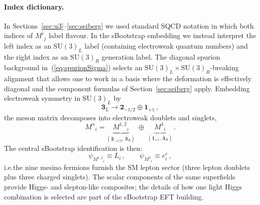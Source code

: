 \documentclass[11pt,a4paper]{article}
\makeatletter
\newcommand{\SU}{\mathrm{SU}}
\newcommand{\ie}{i.e.\@}
\makeatother
\begin{document}
\paragraph{Index dictionary.}
In Sections~\ref{sec:u3}--\ref{sec:seiberg} we used standard SQCD notation in
which both indices of $M^i{}_j$ label flavour.  In the sBootstrap embedding we
instead interpret the left index as an $\SU(3)_L$ label (containing electroweak
quantum numbers) and the right index as an $\SU(3)_R$ generation label.
The diagonal spurion background in~(\ref{eq:spurionSigma}) selects an
$\SU(3)_L\times\SU(3)_R$-breaking alignment that allows one to work in a basis
where the deformation is effectively diagonal and the component formulas of
Section~\ref{sec:seiberg} apply.
Embedding electroweak symmetry in $\SU(3)_L$ by
\begin{equation}
  \mathbf{3}_L \to \mathbf{2}_{-1/2}\oplus \mathbf{1}_{+1}\,,
  \label{eq:3L_decomp}
\end{equation}
the meson matrix decomposes into electroweak doublets and singlets,
\begin{equation}
  M^\alpha{}_i
  = \underbrace{M^{1,2}{}_i}_{(\mathbf{2}_{-1/2},\,\bar{\mathbf{3}}_R)}
  \;\oplus\;
  \underbrace{M^{3}{}_i}_{(\mathbf{1}_{+1},\,\bar{\mathbf{3}}_R)}\,.
  \label{eq:meson_decomp}
\end{equation}
The central sBootstrap identification is then:
\begin{equation}
  \psi_{M^{1,2}{}_i}\equiv L_i\,,
  \qquad
  \psi_{M^{3}{}_i}\equiv e^c_i\,,
  \label{eq:mesinos_leptons}
\end{equation}
\ie the nine mesino fermions furnish the SM lepton sector (three lepton
doublets plus three charged singlets).  The scalar components of the same
superfields provide Higgs- and slepton-like composites; the details of how one
light Higgs combination is selected are part of the sBootstrap EFT building.
\end{document}

